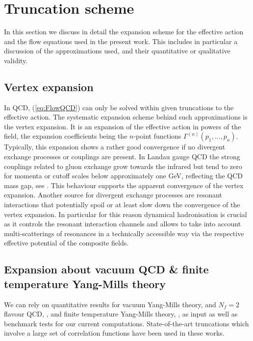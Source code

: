 \documentclass[%
reprint,
superscriptaddress,
showpacs,preprintnumbers,
 amsmath,amssymb,
 aps,
prd,
]{revtex4-1}
\def\eq#1{(\ref{#1})}
\begin{document}
\section{Truncation scheme}\label{sec:TruncG}
In this section we discuss in detail the expansion scheme for the
effective action and the flow equations used in the present work. This
includes in particular a discussion of the approximations used, and
their quantitative or qualitative validity.


\subsection{Vertex expansion}
In QCD, \eq{eq:FlowQCD} can only be solved within given truncations to
the effective action. The systematic expansion scheme behind such
approximations is the vertex expansion. It is an expansion of the
effective action in powers of the field, the expansion coefficients
being the $n$-point functions $\Gamma^{(n)}(p_1,...,p_n)$. Typically,
this expansion shows a rather good convergence if no divergent
exchange processes or couplings are present. In Landau gauge QCD the
strong couplings related to gluon exchange grow towards the infrared
but tend to zero for momenta or cutoff scales below approximately one
GeV, reflecting the QCD mass gap, see \cite{Mitter:2014wpa,
  Braun:2014ata, Rennecke:2015eba, Rennecke:2015, Cyrol:2017ewj}. This
behaviour supports the apparent convergence of the vertex
expansion. Another source for divergent exchange processes are
resonant interactions that potentially spoil or at least slow down the
convergence of the vertex expansion. In particular for this reason
dynamical hadronisation is crucial as it controls the resonant
interaction channels and allows to take into account multi-scatterings
of resonances in a technically accessible way via the respective
effective potential of the composite fields.

\subsection{Expansion about vacuum QCD \& finite temperature
  Yang-Mills theory}\label{sec:ExpVac+FinT}
  
We can rely on quantitative results for vacuum Yang-Mills theory,
\cite{Cyrol:2016tym} and $N_f=2$ flavour QCD,
\cite{Mitter:2014wpa,Cyrol:2017ewj}, and finite temperature Yang-Mills
theory, \cite{Cyrol:2017qkl}, as input as well as benchmark tests for
our current computations. State-of-the-art truncations which involve a
large set of correlation functions have been used in these works.
\end{document}
